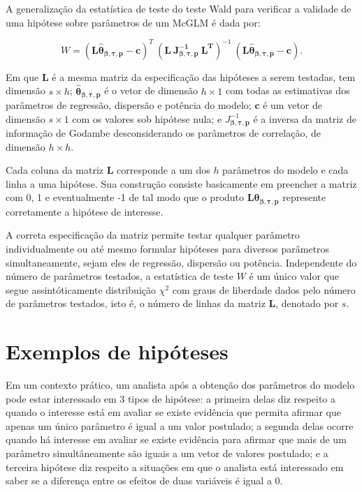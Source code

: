 A generalização da estatística de teste do teste Wald para verificar a validade de uma hipótese sobre parâmetros de um McGLM é dada por:

\begin{equation}
W = (\boldsymbol{L\hat\theta_{\beta,\tau,p}} - \boldsymbol{c})^T \ (\boldsymbol{L \ J_{\boldsymbol{{\beta,\tau,p}}}^{-1} \ L^T})^{-1} \ (\boldsymbol{L\hat\theta_{\beta,\tau,p}} - \boldsymbol{c}).
\end{equation}

\noindent Em que $\boldsymbol{L}$ é a mesma matriz da especificação das hipóteses a serem testadas, tem dimensão $s \times h$; $\boldsymbol{\hat\theta_{\beta,\tau,p}}$ é o vetor de dimensão $h \times 1$ com todas as estimativas dos parâmetros de regressão, dispersão e potência do modelo; $\boldsymbol{c}$ é um vetor de dimensão $s \times 1$ com os valores sob hipótese nula; e $J_{\boldsymbol{{\beta,\tau,p}}}^{-1}$ é a inversa da matriz de informação de Godambe desconsiderando os parâmetros de correlação, de dimensão $h \times h$.

Cada coluna da matriz $\boldsymbol{L}$ corresponde a um dos $h$ parâmetros do modelo e cada linha a uma hipótese. Sua construção consiste basicamente em preencher a matriz com 0, 1 e eventualmente -1 de tal modo que o produto $\boldsymbol{L}\boldsymbol{\theta_{\beta,\tau,p}}$ represente corretamente a hipótese de interesse.

A correta especificação da matriz permite testar qualquer parâmetro individualmente ou até mesmo formular hipóteses para diversos parâmetros simultaneamente, sejam eles de regressão, dispersão ou potência. Independente do número de parâmetros testados, a estatística de teste $W$ é um único valor que segue assintóticamente distribuição $\chi^2$ com graus de liberdade dados pelo número de parâmetros testados, isto é, o número de linhas da matriz $\boldsymbol{L}$, denotado por $s$.

\section{Exemplos de hipóteses}

Em um contexto prático, um analista após a obtenção dos parâmetros do modelo pode estar interessado em 3 tipos de hipótese: a primeira delas diz respeito a quando o interesse está em avaliar se existe evidência que permita afirmar que apenas um único parâmetro é igual a um valor postulado; a segunda delas ocorre quando há interesse em avaliar se existe evidência para afirmar que mais de um parâmetro simultâneamente são iguais a um vetor de valores postulado; e a terceira hipótese diz respeito a situações em que o analista está interessado em saber se a diferença entre os efeitos de duas variáveis é igual a 0.

